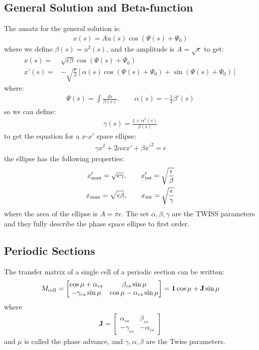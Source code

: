\documentclass{article}
\numberwithin{equation}{section}
\begin{document}
\subsection{ General Solution and Beta-function }
The ansatz for the general solution is:
\begin{align}
x(s) = A u(s) \cos(\Psi(s)+\Psi_0)
\end{align}
where we define $\beta(s) = u^2(s)$, and the amplitude is $A = \sqrt{\epsilon}$ to get:
\begin{align}
x(s) =& \sqrt{\epsilon \beta} \cos(\Psi(s)+\Psi_0) \\
x'(s) =& -\sqrt{\frac{\epsilon}{\beta}} \left[ \alpha(s) \cos(\Psi(s)+\Psi_0) + \sin(\Psi(s)+\Psi_0 )\right]
\end{align}
where:
\begin{align}
\Psi(s) = \int \frac{ds}{\beta(s)} , \qquad \alpha(s) = -\frac{1}{2}\beta'(s)
\end{align}
so we can define:
\begin{align}
\gamma(s) = \frac{1+\alpha^2(s)}{\beta(s)}
\end{align}
to get the equation for a $x$-$x'$ space ellipse:
\begin{align}
\gamma x^2 + 2 \alpha x x' + \beta x'^2 = \epsilon
\end{align}
the ellipse has the following properties:
\begin{align}
x'_{\rm max} = \sqrt{\epsilon \gamma} ,\qquad x'_{\rm int} = \sqrt{\frac{\epsilon}{\beta}} \\
x_{\rm max} = \sqrt{\epsilon \beta} ,\qquad x_{\rm int} = \sqrt{\frac{\epsilon}{\gamma}}
\end{align}
where the area of the ellipse is $A = \pi \epsilon$. The set $\alpha, \beta, \gamma$ are the TWISS parameters and they fully describe the phase space ellipse to first order.

\subsection{ Periodic Sections }

The transfer matrix of a single cell of a periodic section can be written:
\begin{align}
M_{\rm cell} = \begin{bmatrix}
\cos \mu + \alpha_{cs} & \beta_{cs} \sin \mu \\
- \gamma_{cs} \sin \mu & \cos \mu - \alpha_{cs} \sin \mu
\end{bmatrix}
 = \mathbf{1} \cos \mu + \mathbf{J} \sin \mu
\end{align}
where 
\begin{align}
\mathbf{J} = \begin{bmatrix}
\alpha_{cs} & \beta_{cs} \\ - \gamma_{cs} & - \alpha_{cs} \end{bmatrix}
\end{align}
and $\mu$ is called the phase advance, and $\gamma, \alpha, \beta$ are the Twiss parameters.
\end{document}

